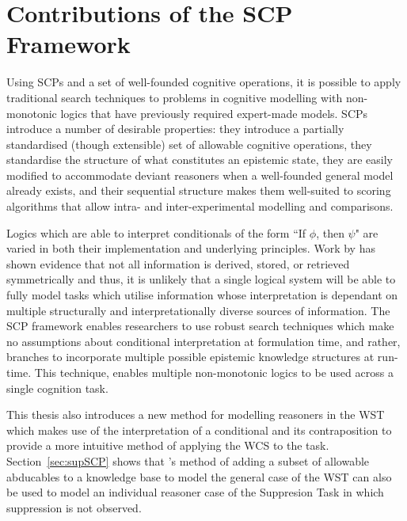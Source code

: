 \section{Contributions of the SCP Framework} \label{sec:contributions}
Using SCPs and a set of well-founded cognitive operations, it is possible to apply traditional search techniques to problems in cognitive modelling with non-monotonic logics that have previously required expert-made models. SCPs introduce a number of desirable properties: they introduce a partially standardised (though extensible) set of allowable cognitive operations, they standardise the structure of what constitutes an epistemic state, they are easily modified to accommodate deviant reasoners when a well-founded general model already exists, and their sequential structure makes them well-suited to scoring algorithms that allow intra- and inter-experimental modelling and comparisons.

Logics which are able to interpret conditionals of the form ``If $\phi$, then $\psi$" are varied in both their implementation and underlying principles. Work by \cite{heit2005defending} has shown evidence that not all information is derived, stored, or retrieved symmetrically and thus, it is unlikely that a single logical system will be able to fully model tasks which utilise information whose interpretation is dependant on multiple structurally and interpretationally diverse sources of information. The SCP framework enables researchers to use robust search techniques which make no assumptions about conditional interpretation at formulation time, and rather, branches to incorporate multiple possible epistemic knowledge structures at run-time. This technique, enables multiple non-monotonic logics to be used across a single cognition task.

This thesis also introduces a new method for modelling reasoners in the WST which makes use of the interpretation of a conditional and its contraposition to provide a more intuitive method of applying the WCS to the task. Section~\ref{sec:supSCP} shows that \cite{dietz2014modeling}'s method of adding a subset of allowable abducables to a knowledge base to model the general case of the WST can also be used to model an individual reasoner case of the Suppresion Task in which suppression is not observed.

